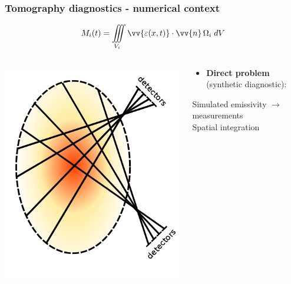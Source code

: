 \documentclass[10pt]{beamer}
\begin{document}
\begin{frame}
\frametitle{Tomography diagnostics - numerical context}

    $$M_i(t) = \iiint\limits_{V_i} \vv{\varepsilon(x,t)}\cdot\vv{n} \,\Omega_i \;{d}V$$
    \vspace{-1cm}
\begin{columns}
    	\begin{column}{0.325\textwidth}
    	
    	\includegraphics[width=\linewidth]{figures/detectors2.png}

    	\end{column}

   	\begin{column}{0.675\textwidth}
   	\begin{center}
   	
   	\begin{block}{}
	\begin{itemize}
	\item \textcolor{myblue}{\textbf{Direct problem} (synthetic diagnostic):\\
	}
	\end{itemize}
	\end{block}
Simulated emissivity $\longrightarrow$ measurements\\
	\alert{Spatial integration}
    \vspace{-0.5cm}


\end{center}
\end{column}
\end{columns}
\end{frame}
\end{document}
